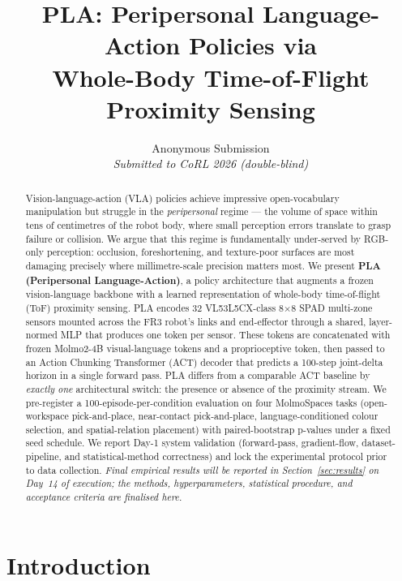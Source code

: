 \documentclass[11pt]{article}
\title{\textbf{PLA: Peripersonal Language-Action Policies via\\Whole-Body Time-of-Flight Proximity Sensing}}
\author{%
  Anonymous Submission\\
  \textit{Submitted to CoRL 2026 (double-blind)}%
}
\date{}
\begin{document}
\maketitle

\begin{abstract}
\noindent
Vision-language-action (VLA) policies achieve impressive open-vocabulary
manipulation but struggle in the \emph{peripersonal} regime --- the volume
of space within tens of centimetres of the robot body, where small
perception errors translate to grasp failure or collision. We argue that
this regime is fundamentally under-served by RGB-only perception: occlusion,
foreshortening, and texture-poor surfaces are most damaging precisely where
millimetre-scale precision matters most. We present \textbf{PLA
(Peripersonal Language-Action)}, a policy architecture that augments a
frozen vision-language backbone with a learned representation of whole-body
time-of-flight (ToF) proximity sensing. PLA encodes 32 VL53L5CX-class
8$\times$8 SPAD multi-zone sensors mounted across the FR3 robot's links and
end-effector through a shared, layer-normed MLP that produces one token per
sensor. These tokens are concatenated with frozen Molmo2-4B visual-language
tokens and a proprioceptive token, then passed to an Action Chunking
Transformer (ACT) decoder that predicts a 100-step joint-delta horizon in a
single forward pass. PLA differs from a comparable ACT baseline by
\emph{exactly one} architectural switch: the presence or absence of the
proximity stream. We pre-register a 100-episode-per-condition evaluation on
four MolmoSpaces tasks (open-workspace pick-and-place, near-contact pick-and-place,
language-conditioned colour selection, and spatial-relation placement) with
paired-bootstrap p-values under a fixed seed schedule. We report Day-1
system validation (forward-pass, gradient-flow, dataset-pipeline, and
statistical-method correctness) and lock the experimental protocol prior to
data collection. \emph{Final empirical results will be reported in
Section~\ref{sec:results} on Day~14 of execution; the methods,
hyperparameters, statistical procedure, and acceptance criteria are
finalised here.}
\end{abstract}

\section{Introduction}
\label{sec:intro}
\end{document}
